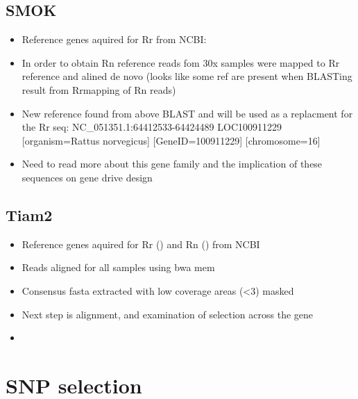 \documentclass[document.tex]{subfiles}
\begin{document}
    \subsection{SMOK}
        \begin{itemize}
        \item Reference genes aquired for Rr from NCBI:
        \item In order to obtain Rn reference reads fom 30x samples were mapped to Rr reference and alined de novo (looks like some ref are present when BLASTing result from Rrmapping of Rn reads)
        \item New reference found from above BLAST and will be used as a replacment for the Rr seq: NC_051351.1:64412533-64424489 LOC100911229 [organism=Rattus norvegicus] [GeneID=100911229] [chromosome=16]
        \item Need to read more about this gene family and the implication of these sequences on gene drive design
        \end{itemize}

        \subsection{Tiam2}
        \begin{itemize}
        \item Reference genes aquired for Rr () and Rn () from NCBI
        \item Reads aligned for all samples using bwa mem 
        \item Consensus fasta extracted with low coverage areas (<3) masked
        \item Next step is alignment, and examination of selection across the gene 
        \item 
        \end{itemize}


\section*{SNP selection}
\end{document}
